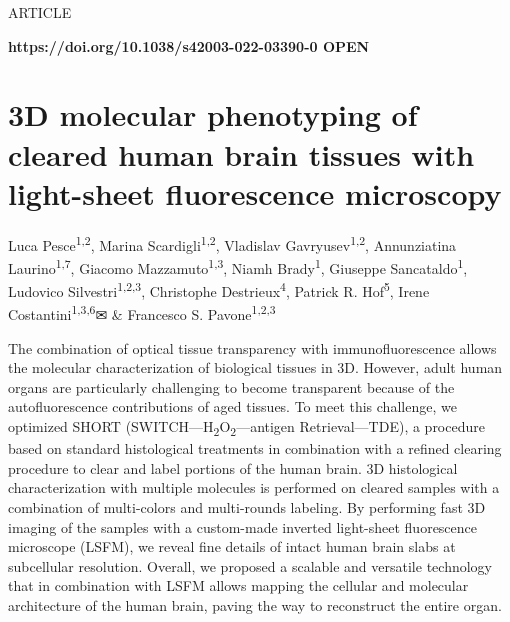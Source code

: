 \documentclass{article}
\begin{document}
ARTICLE

\textbf{https://doi.org/10.1038/s42003-022-03390-0 OPEN}

\section*{3D molecular phenotyping of cleared human brain tissues with light-sheet fluorescence microscopy}

Luca Pesce\textsuperscript{1,2}, Marina Scardigli\textsuperscript{1,2}, Vladislav Gavryusev\textsuperscript{1,2}, Annunziatina Laurino\textsuperscript{1,7}, Giacomo Mazzamuto\textsuperscript{1,3}, Niamh Brady\textsuperscript{1}, Giuseppe Sancataldo\textsuperscript{1}, Ludovico Silvestri\textsuperscript{1,2,3}, Christophe Destrieux\textsuperscript{4}, Patrick R. Hof\textsuperscript{5}, Irene Costantini\textsuperscript{1,3,6}\textsf{✉} \& Francesco S. Pavone\textsuperscript{1,2,3}

The combination of optical tissue transparency with immunofluorescence allows the molecular characterization of biological tissues in 3D. However, adult human organs are particularly challenging to become transparent because of the autofluorescence contributions of aged tissues. To meet this challenge, we optimized SHORT (SWITCH—H\textsubscript{2}O\textsubscript{2}—antigen Retrieval—TDE), a procedure based on standard histological treatments in combination with a refined clearing procedure to clear and label portions of the human brain. 3D histological characterization with multiple molecules is performed on cleared samples with a combination of multi-colors and multi-rounds labeling. By performing fast 3D imaging of the samples with a custom-made inverted light-sheet fluorescence microscope (LSFM), we reveal fine details of intact human brain slabs at subcellular resolution. Overall, we proposed a scalable and versatile technology that in combination with LSFM allows mapping the cellular and molecular architecture of the human brain, paving the way to reconstruct the entire organ.
\end{document}
